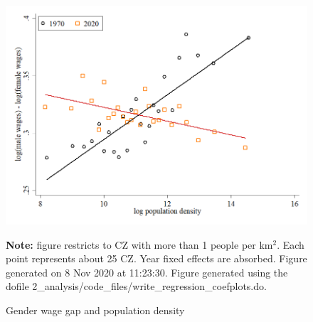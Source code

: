 \begin{figure}[!h]
\centering
\caption{Gender wage gap and population density}
\includegraphics[width=1\textwidth]{../2_analysis/output/figures/l_czone_pop_1970_vs_2020}
\par \begin{minipage}[h]{\textwidth}{\tiny\textbf{Note:} figure restricts to CZ with more than 1 people per km$^2$. Each point represents about 25 CZ. Year fixed effects are absorbed. Figure generated on  8 Nov 2020 at 11:23:30. Figure generated using the dofile 2\_analysis/code\_files/write\_regression\_coefplots.do.}\end{minipage}
\end{figure}
